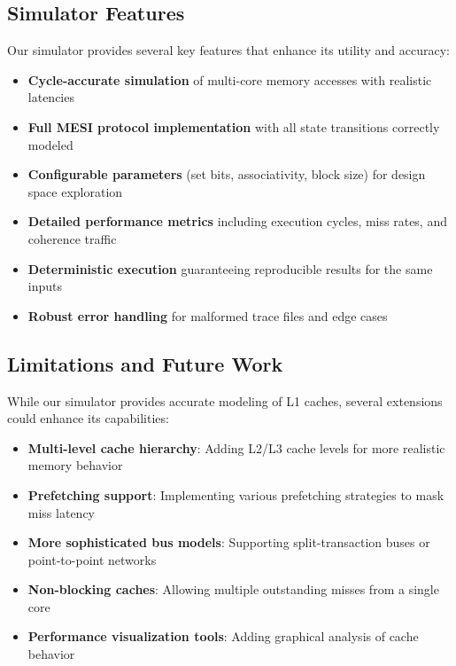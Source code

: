 \documentclass[11pt]{article}
\begin{document}
\subsection{Simulator Features}

Our simulator provides several key features that enhance its utility and accuracy:

\begin{itemize}
    \item \textbf{Cycle-accurate simulation} of multi-core memory accesses with realistic latencies
    \item \textbf{Full MESI protocol implementation} with all state transitions correctly modeled
    \item \textbf{Configurable parameters} (set bits, associativity, block size) for design space exploration
    \item \textbf{Detailed performance metrics} including execution cycles, miss rates, and coherence traffic
    \item \textbf{Deterministic execution} guaranteeing reproducible results for the same inputs
    \item \textbf{Robust error handling} for malformed trace files and edge cases
\end{itemize}

\subsection{Limitations and Future Work}

While our simulator provides accurate modeling of L1 caches, several extensions could enhance its capabilities:

\begin{itemize}
    \item \textbf{Multi-level cache hierarchy}: Adding L2/L3 cache levels for more realistic memory behavior
    \item \textbf{Prefetching support}: Implementing various prefetching strategies to mask miss latency
    \item \textbf{More sophisticated bus models}: Supporting split-transaction buses or point-to-point networks
    \item \textbf{Non-blocking caches}: Allowing multiple outstanding misses from a single core
    \item \textbf{Performance visualization tools}: Adding graphical analysis of cache behavior
\end{itemize}
\end{document}
